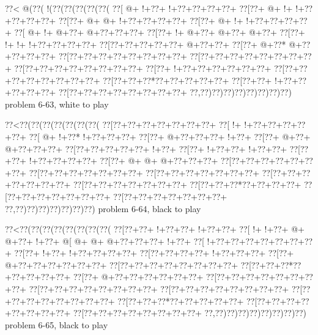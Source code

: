 \vbox{\vbox{\goo
\0??<\- @(\0??(\- !(\0??(\0??(\0??(\0??(\0??(
\0??[\- @+\- !+\0??+\- !+\0??+\0??+\0??+\0??+
\0??[\0??+\- @+\- !+\- !+\0??+\0??+\0??+\0??+
\0??[\0??+\- @+\- @+\- !+\0??+\0??+\0??+\0??+
\0??[\0??+\- @+\- !+\- !+\0??+\0??+\0??+\0??+
\0??[\- @+\- !+\- @+\0??+\- @+\0??+\0??+\0??+
\0??[\0??+\- !+\- @+\0??+\- @+\0??+\- @+\0??+
\0??[\0??+\- !+\- !+\- !+\0??+\0??+\0??+\0??+
\0??[\0??+\0??+\0??+\0??+\0??+\- @+\0??+\0??+
\0??[\0??+\- @+\0??*\- @+\0??+\0??+\0??+\0??+
\0??[\0??+\0??+\0??+\0??+\0??+\0??+\0??+\0??+
\0??[\0??+\0??+\0??+\0??+\0??+\0??+\0??+\0??+
\0??[\0??+\0??+\0??+\0??+\0??+\0??+\0??+\0??+
\0??[\0??+\- !+\0??+\0??+\0??+\0??+\0??+\0??+
\0??[\0??+\0??+\0??+\0??+\0??+\0??+\0??+\0??+
\0??[\0??+\0??+\0??*\0??+\0??+\0??+\0??+\0??+
\0??[\0??+\0??+\- !+\0??+\0??+\0??+\0??+\0??+
\0??[\0??+\0??+\0??+\0??+\0??+\0??+\0??+\0??+
\0??,\0??)\0??)\0??)\0??)\0??)\0??)\0??)\0??)
}
\hfil problem 6-63, white to play\hfil\break
}

\vbox{\vbox{\goo
\0??<\0??(\0??(\0??(\0??(\0??(\0??(\0??(
\0??[\0??+\0??+\0??+\0??+\0??+\0??+\0??+
\0??[\- !+\- !+\0??+\0??+\0??+\0??+\0??+
\0??[\- @+\- !+\0??*\- !+\0??+\0??+\0??+
\0??[\0??+\- @+\0??+\0??+\0??+\- !+\0??+
\0??[\0??+\- @+\0??+\- @+\0??+\0??+\0??+
\0??[\0??+\0??+\0??+\0??+\0??+\- !+\0??+
\0??[\0??+\- !+\0??+\0??+\- !+\0??+\0??+
\0??[\0??+\0??+\- !+\0??+\0??+\0??+\0??+
\0??[\0??+\- @+\- @+\- @+\0??+\0??+\0??+
\0??[\0??+\0??+\0??+\0??+\0??+\0??+\0??+
\0??[\0??+\0??+\0??+\0??+\0??+\0??+\0??+
\0??[\0??+\0??+\0??+\0??+\0??+\0??+\0??+
\0??[\0??+\0??+\0??+\0??+\0??+\0??+\0??+
\0??[\0??+\0??+\0??+\0??+\0??+\0??+\0??+
\0??[\0??+\0??+\0??*\0??+\0??+\0??+\0??+
\0??[\0??+\0??+\0??+\0??+\0??+\0??+\0??+
\0??[\0??+\0??+\0??+\0??+\0??+\0??+\0??+
\0??,\0??)\0??)\0??)\0??)\0??)\0??)\0??)
}
\hfil problem 6-64, black to play\hfil\break
}

\vbox{\vbox{\goo
\0??<\0??(\0??(\0??(\0??(\0??(\0??(\0??(\0??(
\0??[\0??+\0??+\- !+\0??+\0??+\- !+\0??+\0??+
\0??[\- !+\- !+\0??+\- @+\- @+\0??+\- !+\0??+
\- @[\- @+\- @+\- @+\0??+\0??+\0??+\- !+\0??+
\0??[\- !+\0??+\0??+\0??+\0??+\0??+\0??+\0??+
\0??[\0??+\- !+\0??+\- !+\0??+\0??+\0??+\0??+
\0??[\0??+\0??+\0??+\0??+\- !+\0??+\0??+\0??+
\0??[\0??+\- @+\0??+\0??+\0??+\0??+\0??+\0??+
\0??[\0??+\0??+\0??+\0??+\0??+\0??+\0??+\0??+
\0??[\0??+\0??+\0??*\0??+\0??+\0??+\0??+\0??+
\0??[\0??+\- @+\0??+\0??+\0??+\0??+\0??+\0??+
\0??[\0??+\0??+\0??+\0??+\0??+\0??+\0??+\0??+
\0??[\0??+\0??+\0??+\0??+\0??+\0??+\0??+\0??+
\0??[\0??+\0??+\0??+\0??+\0??+\0??+\0??+\0??+
\0??[\0??+\0??+\0??+\0??+\0??+\0??+\0??+\0??+
\0??[\0??+\0??+\0??*\0??+\0??+\0??+\0??+\0??+
\0??[\0??+\0??+\0??+\0??+\0??+\0??+\0??+\0??+
\0??[\0??+\0??+\0??+\0??+\0??+\0??+\0??+\0??+
\0??,\0??)\0??)\0??)\0??)\0??)\0??)\0??)\0??)
}
\hfil problem 6-65, black to play\hfil\break
}

